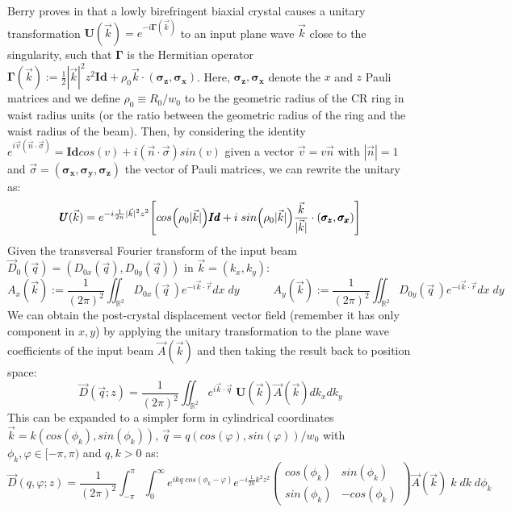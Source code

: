 \documentclass[11pt, a4paper, twoside]{article} %
\newcommand{\R}{\mathbb{R}} %
\begin{document}
Berry proves in \cite{Berry, BerryJeffrey} that a lowly birefringent biaxial crystal causes a unitary transformation $\pmb{U}(\vec{k})=e^{-i\pmb{\Gamma}(\vec{k})}$ to an input plane wave $\vec{k}$ close to the singularity, such that $\pmb{\Gamma}$ is the Hermitian operator $\pmb{\Gamma}(\vec{k}):=\frac{1}{2}|\vec{k}|^2z^2\pmb{Id}+\rho_0\vec{k}\cdot (\pmb{\sigma_z}, \pmb{\sigma_x})$. Here, $\pmb{\sigma_z}, \pmb{\sigma_x}$ denote the $x$ and $z$ Pauli matrices and we define $\rho_0\equiv R_0/w_0$ to be the geometric radius of the CR ring in waist radius units (or the ratio between the geometric radius of the ring and the waist radius of the beam). Then, by considering the identity $e^{i\vec{v}(\vec{n}\cdot \vec{\sigma})}=\pmb{Id}cos(v)+i(\vec{n}\cdot \vec{\sigma}) sin(v)$ given a vector $\vec{v}=v\vec{n}$ with $|\vec{n}|=1$ and $\vec{\sigma}=(\pmb{\sigma_x},\pmb{\sigma_y},\pmb{\sigma_z})$ the vector of Pauli matrices, we can rewrite the unitary as:
\begin{equation}
\pmb{U}(\vec{k}) = e^{-i\frac{1}{2n}|\vec{k}|^2z^2}\qty[cos\qty(\rho_0|\vec{k}|)\pmb{Id}+i\;sin\qty(\rho_0|\vec{k}|)\frac{\vec{k}}{|\vec{k}|}\cdot (\pmb{\sigma_z},\pmb{\sigma_x})]
\end{equation}
Given the transversal Fourier transform of the input beam $\vec{D}_0(\vec{q})=(D_{0x}(\vec{q}), D_{0y}(\vec{q}))$ in $\vec{k}=(k_x,k_y)$:
\begin{equation}
A_x(\vec{k}):=\frac{1}{(2\pi)^2}\iint_{\R^2} D_{0x}(\vec{q}\,)e^{-i\vec{k}\cdot\vec{r}}dx\;dy \quad \quad \quad A_y(\vec{k}):=\frac{1}{(2\pi)^2}\iint_{\R^2} D_{0y}(\vec{q}\,)e^{-i\vec{k}\cdot\vec{r}}dx\;dy
\end{equation}
We can obtain the post-crystal displacement vector field (remember it has only component in $x,y$) by applying the unitary transformation to the plane wave coefficients of the input beam $\vec{A}(\vec{k})$ and then taking the result back to position space:
\begin{equation}
\vec{D}(\vec{q};z)=\frac{1}{(2\pi)^2}\iint_{\R^2}e^{i\vec{k}\cdot\vec{q}}\;\pmb{U}(\vec{k})\vec{A}(\vec{k})dk_xdk_y
\end{equation}
This can be expanded to a simpler form in cylindrical coordinates $\vec{k}=k(cos(\phi_k),sin(\phi_k))$, $\vec{q}=q(cos(\varphi), sin(\varphi))/w_0$ with $\phi_k,\varphi\in[-\pi,\pi)$ and $q,k>0$ as:
\begin{equation}\label{geez}
\vec{D}(q,\varphi;z)=\frac{1}{(2\pi)^2}\int_{-\pi}^{\pi}\int_{0}^\infty e^{ikq \;cos(\phi_k-\varphi)}e^{-i\frac{1}{2n}k^2z^2}\begin{pmatrix}
cos(\phi_k) & sin(\phi_k)\\
sin(\phi_k) & -cos(\phi_k)
\end{pmatrix} \vec{A}(\vec{k})\;k\;dk\;d\phi_k
\end{equation}
\end{document}
